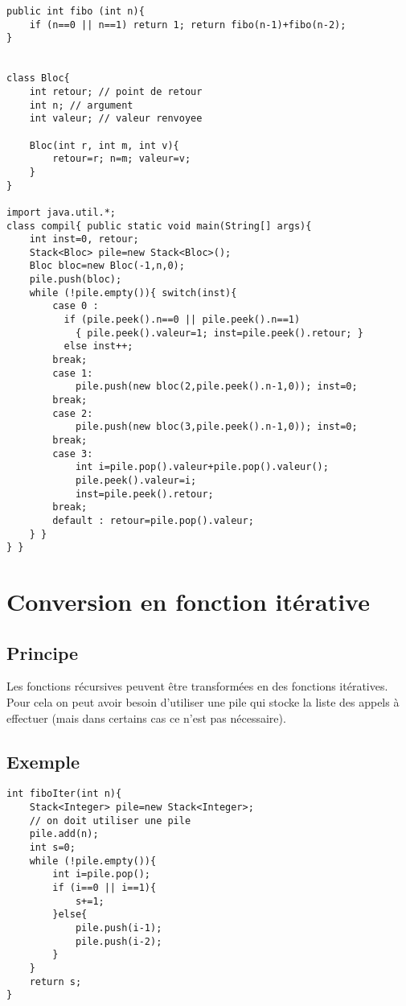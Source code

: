 \documentclass[a4paper,10pt]{book} %
\begin{document}
\begin{lstlisting}
public int fibo (int n){
	if (n==0 || n==1) return 1; return fibo(n-1)+fibo(n-2);
}


class Bloc{
	int retour; // point de retour
	int n; // argument
	int valeur; // valeur renvoyee
	
	Bloc(int r, int m, int v){ 
		retour=r; n=m; valeur=v;
	}
}

import java.util.*;
class compil{ public static void main(String[] args){
	int inst=0, retour;
	Stack<Bloc> pile=new Stack<Bloc>();
	Bloc bloc=new Bloc(-1,n,0);
	pile.push(bloc);
	while (!pile.empty()){ switch(inst){
		case 0 :
		  if (pile.peek().n==0 || pile.peek().n==1)
			{ pile.peek().valeur=1; inst=pile.peek().retour; }
		  else inst++;
		break;
		case 1:
			pile.push(new bloc(2,pile.peek().n-1,0)); inst=0;
		break;
		case 2:
			pile.push(new bloc(3,pile.peek().n-1,0)); inst=0;
		break;
		case 3:
			int i=pile.pop().valeur+pile.pop().valeur();
			pile.peek().valeur=i;
			inst=pile.peek().retour;
		break;
		default : retour=pile.pop().valeur;
	} }
} }
\end{lstlisting}

\newpage

\section{Conversion en fonction itérative}
\subsection{Principe}
Les fonctions récursives peuvent être transformées en des fonctions itératives. Pour cela on peut avoir besoin d'utiliser une pile qui stocke la liste des appels à effectuer (mais dans certains cas ce n'est pas nécessaire).

\subsection{Exemple}
\begin{lstlisting}
int fiboIter(int n){
	Stack<Integer> pile=new Stack<Integer>;
	// on doit utiliser une pile
	pile.add(n);
	int s=0;
	while (!pile.empty()){
		int i=pile.pop();
		if (i==0 || i==1){
			s+=1;
		}else{
			pile.push(i-1);
			pile.push(i-2);
		}
	}
	return s;
}
\end{lstlisting}
\end{document}

